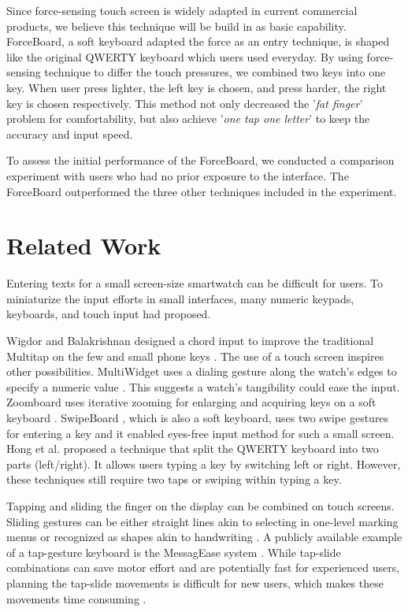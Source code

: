 \documentclass{sigchi}
\begin{document}
Since force-sensing touch screen is widely adapted in current commercial products, we believe this technique will be build in as basic capability.
ForceBoard, a soft keyboard adapted the force as an entry technique, is shaped like the original QWERTY keyboard which users used everyday. By using force-sensing technique to differ the touch pressures, we combined two keys into one key. When user press lighter, the left key is chosen, and press harder, the right key is chosen respectively. This method not only decreased the '{\it fat finger}' problem for comfortability, but also achieve '{\it one tap one letter}' to keep the accuracy and input speed.


To assess the initial performance of the ForceBoard, we conducted a comparison experiment with users who had no prior exposure to the interface. The ForceBoard outperformed the three other techniques included in the experiment.

\section{Related Work}
Entering texts for a small screen-size smartwatch can be difficult for users. To miniaturize the input efforts in small interfaces, many numeric keypads, keyboards, and touch input had proposed. 

Wigdor and Balakrishnan designed a chord input to improve the traditional Multitap on the few and small phone keys \cite{Wigdor:2004:CCC:985692.985703}. The use of a touch screen inspires other possibilities. MultiWidget uses a dialing gesture along the watch's edges to specify a numeric value \cite{4067721}. This suggests a watch's tangibility could ease the input. Zoomboard uses iterative zooming for enlarging and acquiring keys on a soft keyboard \cite{Oney:2013:ZDQ:2470654.2481387}. SwipeBoard  \cite{Chen:2014:STE:2642918.2647354}, which is also a soft keyboard, uses two swipe gestures for entering a key and it enabled eyes-free input method for such a small screen. Hong et al. \cite{Hong:2015:SSS:2702123.2702273} proposed a technique that split the QWERTY keyboard into two parts (left/right). It allows users typing a key by switching left or right. However, these techniques still require two taps or swiping within typing a key.

Tapping and sliding the finger on the display can be combined on touch screens. Sliding gestures can be either straight lines akin to selecting in one-level marking menus\cite{Isokoski:2004:PMS:985692.985746} or recognized as shapes akin to handwriting \cite{Isokoski:2010:MET:1868914.1869004}. A publicly available example of a tap-gesture keyboard is the MessagEase system \cite{Nesbat:2003:SFF:958432.958437}. While tap-slide combinations can save motor effort and are potentially fast for experienced users, planning the tap-slide movements is difficult for new users, which makes these movements time consuming \cite{Isokoski:2004:PMS:985692.985746}.
\end{document}

